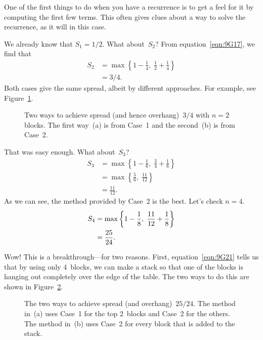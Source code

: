 One of the first things to do when you have a recurrence is to get a
feel for it by computing the first few terms.  This often gives clues
about a way to solve the recurrence, as it will in this case.

We already know that $S_1 = 1/2$.  What about~$S_2$?  From
equation~\ref{eqn:9G17}, we find that
\begin{align*}
S_2
    &= \max \left\{ 1 - \frac{1}{4}, \; \frac{1}{2} + \frac{1}{4} \right \} \\
    &= 3/4.
\end{align*}
Both cases give the same spread, albeit by different approaches.  For
example, see Figure~\ref{fig:9G20}.

\begin{figure}

\qquad
{}

\caption{Two ways to achieve spread (and hence overhang)~$3/4$ with $n
  = 2$ blocks.  The first way~(a) is from Case~1 and the second~(b) is
  from Case~2.}

\label{fig:9G20}

\end{figure}

That was easy enough.  What about~$S_3$?
\begin{align*}
S_3 &= \max\left\{ 1 - \frac{1}{6}, \; \frac{3}{4} + \frac{1}{6} \right\} \\
    &= \max\left\{ \frac{5}{6}, \; \frac{11}{12} \right\} \\
    &= \frac{11}{12}.
\end{align*}
As we can see, the method provided by Case~2 is the best.  Let's check
$n = 4$.
\begin{align}
S_4 &= \max\left\{ 1 - \frac{1}{8}, \; \frac{11}{12} + \frac{1}{8} \right\}
    \notag \\
    &= \frac{25}{24}. \label{eqn:9G21}
\end{align}

Wow!  This is a breakthrough---for two reasons.  First,
equation~\ref{eqn:9G21} tells us that by using only 4~blocks, we can
make a stack so that one of the blocks is hanging out completely over
the edge of the table.  The two ways to do this are shown in
Figure~\ref{fig:9G22}.

\begin{figure}

\qquad
{}

\caption{The two ways to achieve spread (and overhang)~$25/24$.  The
  method in~(a) uses Case~1 for the top 2~blocks and Case~2 for the
  others.  The method in~(b) uses Case~2 for every block that is added
to the stack.}

\label{fig:9G22}

\end{figure}

